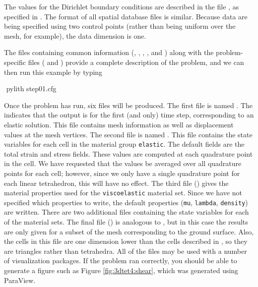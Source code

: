 The values for the Dirichlet boundary conditions are described in
the file , as specified in .
The format of all spatial database files is similar. Because data
are being specified using two control points (rather than being uniform
over the mesh, for example), the data dimension is one.

The files containing common information
(,
, ,
, and
) along with the
problem-specific files ( and
) provide a complete description
of the problem, and we can then run this example by typing
\begin{shell}
$$ pylith step01.cfg
\end{shell}
Once the problem has run, six files will be produced. The first file
is named . The 
indicates that the output is for the first (and only) time step,
corresponding to an elastic solution. This file contains mesh
information as well as displacement values at the mesh vertices. The
second file is named
. This file contains
the state variables for each cell in the material group
\texttt{elastic}.  The default fields are the total strain and stress
fields. These values are computed at each quadrature point in the
cell. We have requested that the values be averaged over all
quadrature points for each cell; however, since we only have a single
quadrature point for each linear tetrahedron, this will have no
effect. The third file
() gives the
material properties used for the \texttt{viscoelastic} material
set. Since we have not specified which properties to write, the
default properties (\texttt{mu}, \texttt{lambda}, \texttt{density})
are written.  There are two additional files containing the state
variables for each of the material sets. The final file
() is analogous to
, but in this case the results are only
given for a subset of the mesh corresponding to the ground
surface. Also, the cells in this file are one dimension lower than the
cells described in , so they are
triangles rather than tetrahedra. All of the  files may
be used with a number of visualization packages. If the problem ran
correctly, you should be able to generate a figure such as Figure
\vref{fig:3dtet4:shear}, which was generated using ParaView.

